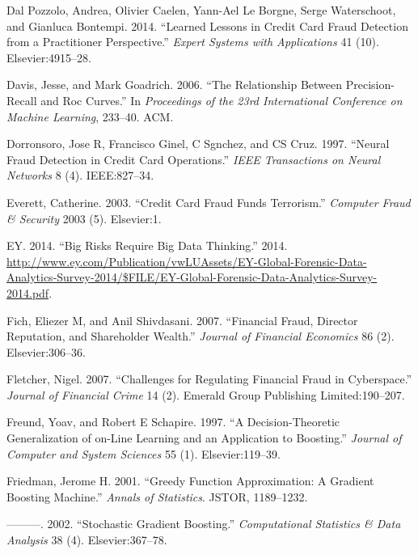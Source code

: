 \documentclass[12pt,]{article}
\begin{document}
\leavevmode\hypertarget{ref-dal2014learned}{}%
Dal Pozzolo, Andrea, Olivier Caelen, Yann-Ael Le Borgne, Serge
Waterschoot, and Gianluca Bontempi. 2014. ``Learned Lessons in Credit
Card Fraud Detection from a Practitioner Perspective.'' \emph{Expert
Systems with Applications} 41 (10). Elsevier:4915--28.

\leavevmode\hypertarget{ref-davis2006relationship}{}%
Davis, Jesse, and Mark Goadrich. 2006. ``The Relationship Between
Precision-Recall and Roc Curves.'' In \emph{Proceedings of the 23rd
International Conference on Machine Learning}, 233--40. ACM.

\leavevmode\hypertarget{ref-dorronsoro1997neural}{}%
Dorronsoro, Jose R, Francisco Ginel, C Sgnchez, and CS Cruz. 1997.
``Neural Fraud Detection in Credit Card Operations.'' \emph{IEEE
Transactions on Neural Networks} 8 (4). IEEE:827--34.

\leavevmode\hypertarget{ref-everett2003credit}{}%
Everett, Catherine. 2003. ``Credit Card Fraud Funds Terrorism.''
\emph{Computer Fraud \& Security} 2003 (5). Elsevier:1.

\leavevmode\hypertarget{ref-analytics_tools_table}{}%
EY. 2014. ``Big Risks Require Big Data Thinking.'' 2014.
\url{http://www.ey.com/Publication/vwLUAssets/EY-Global-Forensic-Data-Analytics-Survey-2014/$FILE/EY-Global-Forensic-Data-Analytics-Survey-2014.pdf}.

\leavevmode\hypertarget{ref-fich2007financial}{}%
Fich, Eliezer M, and Anil Shivdasani. 2007. ``Financial Fraud, Director
Reputation, and Shareholder Wealth.'' \emph{Journal of Financial
Economics} 86 (2). Elsevier:306--36.

\leavevmode\hypertarget{ref-fletcher2007challenges}{}%
Fletcher, Nigel. 2007. ``Challenges for Regulating Financial Fraud in
Cyberspace.'' \emph{Journal of Financial Crime} 14 (2). Emerald Group
Publishing Limited:190--207.

\leavevmode\hypertarget{ref-freund1997decision}{}%
Freund, Yoav, and Robert E Schapire. 1997. ``A Decision-Theoretic
Generalization of on-Line Learning and an Application to Boosting.''
\emph{Journal of Computer and System Sciences} 55 (1). Elsevier:119--39.

\leavevmode\hypertarget{ref-friedman2001greedy}{}%
Friedman, Jerome H. 2001. ``Greedy Function Approximation: A Gradient
Boosting Machine.'' \emph{Annals of Statistics}. JSTOR, 1189--1232.

\leavevmode\hypertarget{ref-friedman2002stochastic}{}%
---------. 2002. ``Stochastic Gradient Boosting.'' \emph{Computational
Statistics \& Data Analysis} 38 (4). Elsevier:367--78.
\end{document}
